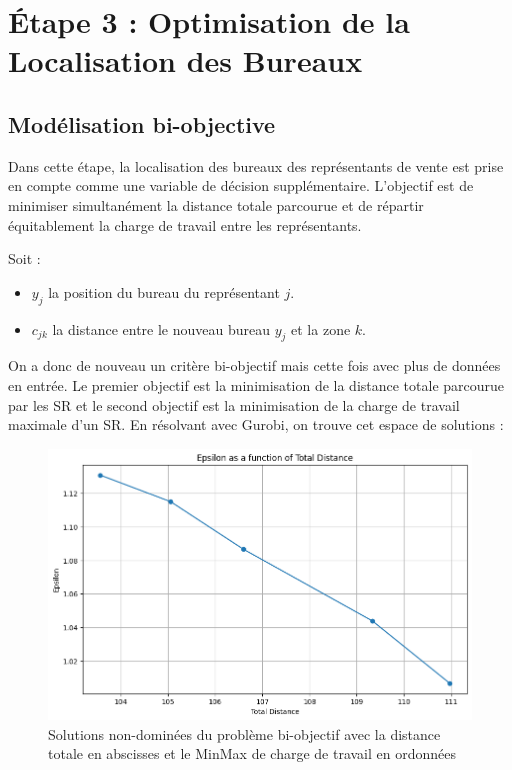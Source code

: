 \section{Étape 3 : Optimisation de la Localisation des Bureaux}
\subsection{Modélisation bi-objective}
Dans cette étape, la localisation des bureaux des représentants de vente est prise en compte comme une variable de décision supplémentaire.
L'objectif est de minimiser simultanément la distance totale parcourue et de répartir équitablement la charge de travail entre les représentants.

Soit :
\begin{itemize}
    \item $y_j$ la position du bureau du représentant $j$.
    \item $c_{jk}$ la distance entre le nouveau bureau $y_j$ et la zone $k$.
\end{itemize}

On a donc de nouveau un critère bi-objectif mais cette fois avec plus de données en entrée. 
Le premier objectif est la minimisation de la distance totale parcourue par les SR et le second objectif est la minimisation de la charge de travail maximale d'un SR. En résolvant avec Gurobi, on trouve cet espace de solutions :
\begin{figure}[H]
    \centering
    \includegraphics[width=\textwidth]{Images/step_3/bi-objective-moivng-office.png}
    \caption{Solutions non-dominées du problème bi-objectif avec la distance totale en abscisses et le MinMax de charge de travail en ordonnées}
    \label{fig:nom_de_reference}
\end{figure}


